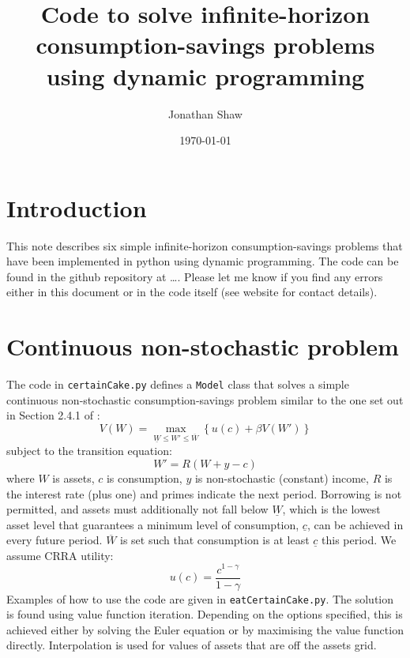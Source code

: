 \documentclass[12pt]{article}
\title{Code to solve infinite-horizon consumption-savings problems using dynamic programming}
\author{
        Jonathan Shaw
}
\date{\today}
\begin{document}
\maketitle

\section{Introduction}

This note describes six simple infinite-horizon consumption-savings problems that have been implemented in python using dynamic programming. The code can be found in the github repository at \ldots. Please let me know if you find any errors either in this document or in the code itself (see website for contact details).

\section{Continuous non-stochastic problem}

The code in \texttt{certainCake.py} defines a \texttt{Model} class that solves a simple continuous non-stochastic consumption-savings problem similar to the one set out in Section 2.4.1 of \citet{adda2003dynamic}:
\begin{equation}
	V(W) = \max_{\underline{W} \leq W' \leq \overline{W}} \left\{ u(c) + \beta V(W') \right\}
\end{equation}
subject to the transition equation:
\begin{equation}
	W' = R (W + y - c)
\end{equation}
where \(W\) is assets, \(c\) is consumption, \(y\) is non-stochastic (constant) income, \(R\) is the interest rate (plus one) and primes indicate the next period. Borrowing is not permitted, and assets must additionally not fall below \(\underline{W}\), which is the lowest asset level that guarantees a minimum level of consumption, \(\underline{c}\), can be achieved in every future period. \(\overline{W}\) is set such that consumption is at least \(\underline{c}\) this period. We assume CRRA utility:
\begin{equation}
	u(c) = \frac{c^{1 - \gamma}}{1 - \gamma}
\end{equation}
Examples of how to use the code are given in \texttt{eatCertainCake.py}. The solution is found using value function iteration. Depending on the options specified, this is achieved either by solving the Euler equation or by maximising the value function directly. Interpolation is used for values of assets that are off the assets grid.
\end{document}
